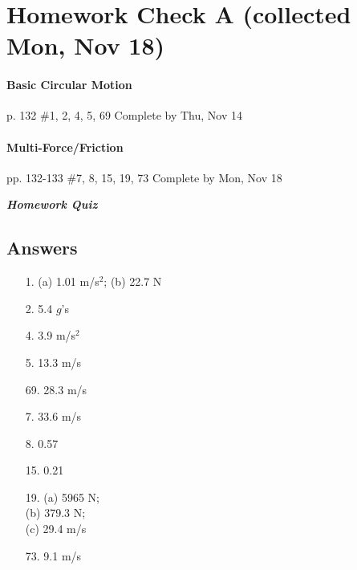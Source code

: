 \documentclass[10pt]{exam}
\begin{document}
\section*{Homework Check A (collected Mon, Nov 18)}




\paragraph{Basic Circular Motion} p. 132 \#1, 2, 4, 5, 69
\dotfill Complete by Thu, Nov 14





\paragraph{Multi-Force/Friction} pp. 132-133 \#7, 8, 15, 19, 73
\dotfill Complete by Mon, Nov 18

\hfill \textbf{\emph{Homework Quiz}}









\subsection*{Answers}

\begin{multicols}{3}

  \begin{itemize}[noitemsep]
    \item[1. ](a) 1.01 m/s$^2$; (b) 22.7 N
    \item[2. ] 5.4 $g$'s
    \item[4. ] 3.9 m/s$^2$
    \item[5. ] 13.3 m/s
    \item[69.] 28.3 m/s
    \item[7. ] 33.6 m/s
    \item[8. ] 0.57
    \item[15.] 0.21
    \item[19.] (a) 5965 N; \\ (b) 379.3 N; \\ (c) 29.4 m/s
    \item[73.] 9.1 m/s
    
    
    
  \end{itemize}
  
\end{multicols}
\end{document}

